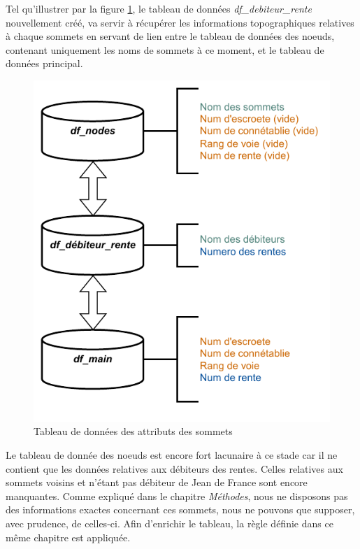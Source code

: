 Tel qu'illustrer par la figure \ref{fig:from_main}, le tableau de données \textit{df\_debiteur\_rente} nouvellement créé, va servir à récupérer les informations topographiques relatives à chaque sommets en servant de lien entre le tableau de données des noeuds, contenant uniquement les noms de sommets à ce moment,  et le tableau de données principal.

\begin{figure}
    \centering
    \includegraphics[scale=0.75]{3.Results/Img/rel-from_main.drawio.pdf}
    \caption{Tableau de données des attributs des sommets}
    \label{fig:from_main}
\end{figure}

Le tableau de donnée des noeuds est encore fort lacunaire à ce stade car il ne contient que les données relatives aux débiteurs des rentes. Celles relatives aux sommets voisins et n'étant pas débiteur de Jean de France sont encore manquantes. Comme expliqué dans le chapitre \textit{Méthodes}, nous ne disposons pas des informations exactes concernant ces sommets, nous ne pouvons que supposer, avec prudence, de celles-ci. Afin d'enrichir le tableau,  la règle définie dans ce même chapitre est appliquée.

